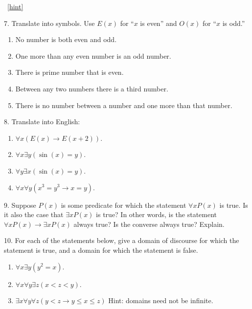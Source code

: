 \documentclass[10pt,]{book}
\theoremstyle{plain}
\theoremstyle{definition}
\theoremstyle{definition}
\theoremstyle{definition}
\numberwithin{equation}{chapter}
\def\imp{\rightarrow}
\newcommand{\lt}{<}
\begin{document}
\begin{exerciselist}
\par\smallskip
~\hfill{\tiny\hyperlink{a-B.1.6}{[hint]}\hypertarget{q-B.1.6}{}}\item[7.]\hypertarget{exercise-62}{}\hypertarget{p-1911}{}%
Translate into symbols. Use \(E(x)\) for ``\(x\) is even'' and \(O(x)\) for ``\(x\) is odd.''%
\leavevmode%
\begin{enumerate}[label=(\alph*)]
\item\hypertarget{li-214}{}\hypertarget{p-1912}{}%
No number is both even and odd.%
\item\hypertarget{li-215}{}\hypertarget{p-1913}{}%
One more than any even number is an odd number.%
\item\hypertarget{li-216}{}\hypertarget{p-1914}{}%
There is prime number that is even.%
\item\hypertarget{li-217}{}\hypertarget{p-1915}{}%
Between any two numbers there is a third number.%
\item\hypertarget{li-218}{}\hypertarget{p-1916}{}%
There is no number between a number and one more than that number.%
\end{enumerate}
\par\smallskip
\item[8.]\hypertarget{exercise-63}{}\hypertarget{p-1918}{}%
Translate into English: \leavevmode%
\begin{enumerate}[label=(\alph*)]
\item\hypertarget{li-224}{}\(\forall x (E(x) \imp E(x +2))\).%
\item\hypertarget{li-225}{}\(\forall x \exists y (\sin(x) = y)\).%
\item\hypertarget{li-226}{}\(\forall y \exists x (\sin(x) = y)\).%
\item\hypertarget{li-227}{}\(\forall x \forall y (x^3 = y^3 \imp x = y)\).%
\end{enumerate}
%
\par\smallskip
\item[9.]\hypertarget{exercise-64}{}\hypertarget{p-1924}{}%
Suppose \(P(x)\) is some predicate for which the statement \(\forall x P(x)\) is true. Is it also the case that \(\exists x P(x)\) is true? In other words, is the statement \(\forall x P(x) \imp \exists x P(x)\) always true? Is the converse always true? Explain.%
\par\smallskip
\item[10.]\hypertarget{exercise-65}{}\hypertarget{p-1925}{}%
For each of the statements below, give a domain of discourse for which the statement is true, and a domain for which the statement is false.%
\par
\hypertarget{p-1926}{}%
\leavevmode%
\begin{enumerate}[label=(\alph*)]
\item\hypertarget{li-232}{}\(\forall x \exists y (y^2 = x)\).%
\item\hypertarget{li-233}{}\(\forall x \forall y \exists z (x \lt  z \lt  y)\).%
\item\hypertarget{li-234}{}\(\exists x \forall y \forall z (y \lt  z \imp y \le x \le z)\) Hint: domains need not be infinite.%
\end{enumerate}
%
\par\smallskip
\end{exerciselist}
\end{document}
